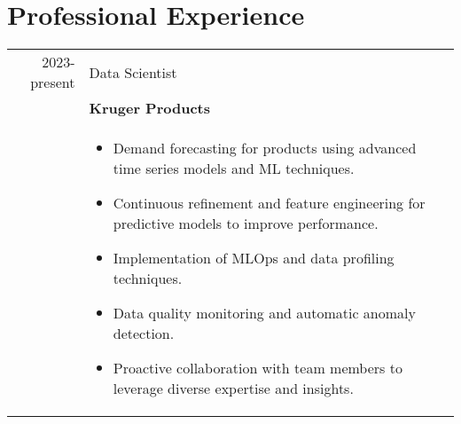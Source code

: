 \documentclass[10pt]{article}
\begin{document}
\section{Professional Experience}
\begin{tabular}{r|p{16cm}}
 \textsc{2023-}present & Data Scientist \\&\textbf{Kruger Products}\\&{
\begin{itemize}
\item Demand forecasting for products using advanced time series models and ML techniques.
\item Continuous refinement and feature engineering for predictive models to improve performance.
\item Implementation of MLOps and data profiling techniques.
\item Data quality monitoring and automatic anomaly detection.
\item Proactive collaboration with team members to leverage diverse expertise and insights.
\end{itemize}}
\multicolumn{3}{c}{}


\end{tabular}
\end{document}
